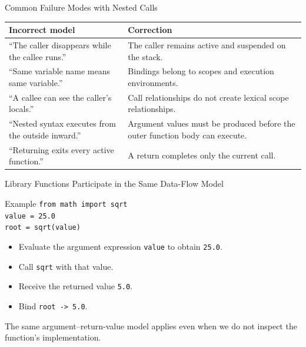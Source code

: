 \documentclass[aspectratio=169,10pt]{beamer}
\begin{document}
\begin{frame}{Common Failure Modes with Nested Calls}
  \begin{center}
    \renewcommand{\arraystretch}{1.20}
    \begin{tabular}{p{}|p{}}
      \textbf{Incorrect model} & \textbf{Correction} \\\hline
      ``The caller disappears while the callee runs.'' & The caller remains active and suspended on the stack. \\
      ``Same variable name means same variable.'' & Bindings belong to scopes and execution environments. \\
      ``A callee can see the caller's locals.'' & Call relationships do not create lexical scope relationships. \\
      ``Nested syntax executes from the outside inward.'' & Argument values must be produced before the outer function body can execute. \\
      ``Returning exits every active function.'' & A return completes only the current call.
    \end{tabular}
  \end{center}
\end{frame}


\begin{frame}{Library Functions Participate in the Same Data-Flow Model}
  \begin{block}{Example}
    \texttt{from math import sqrt}\\[0.08in]
    \texttt{value = 25.0}\\
    \texttt{root = sqrt(value)}
  \end{block}

  \begin{itemize}
    \item Evaluate the argument expression \texttt{value} to obtain \texttt{25.0}.
    \item Call \texttt{sqrt} with that value.
    \item Receive the returned value \texttt{5.0}.
    \item Bind \texttt{root -> 5.0}.
  \end{itemize}

  \begin{keyidea}
    The same argument--return-value model applies even when we do not inspect the function's implementation.
  \end{keyidea}
\end{frame}
\end{document}
